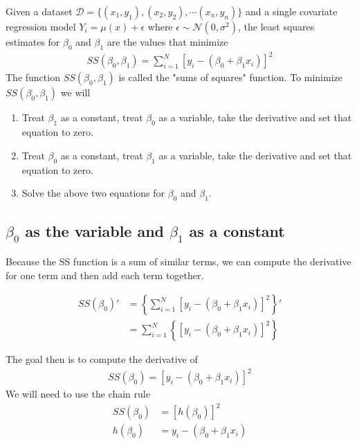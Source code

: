 Given a dataset $\mathcal{D} = \{ (x_{1},y_{1}), (x_{2},y_{2}), \cdots (x_{n},y_{n}) \}$ and a single covariate regression model $Y_{i} = \mu(x) + \epsilon$ where $\epsilon \sim \mathcal{N}(0,\sigma^{2})$, the least squares estimates for $\beta_{0}$ and $\beta_{1}$ are the values that minimize 
\begin{align}
    SS(\beta_{0}, \beta_{1}) = \sum_{i=1}^{N} \left[ y_{i} - \left(\beta_{0} + \beta_{1}x_{i} \right)  \right]^{2}
\end{align}
The function $SS(\beta_{0}, \beta_{1})$ is called the "sums of squares" function.
To minimize $SS(\beta_{0}, \beta_{1})$ we will
\begin{enumerate}
    \item Treat $\beta_{1}$ as a constant, treat $\beta_{0}$ as a variable, take the derivative and set that equation to zero. 
    \item Treat $\beta_{0}$ as a constant, treat $\beta_{1}$ as a variable, take the derivative and set that equation to zero. 
    \item Solve the above two equations for $\beta_{0}$ and $\beta_{1}$.
\end{enumerate}

\subsection{ $\beta_{0}$ as the variable and $\beta_{1}$ as a constant}

Because the SS function is a sum of similar terms, we can compute the derivative for one term and then add each term together. 

\begin{align}
    SS(\beta_{0})' &= \left\{ \sum_{i=1}^{N} \left[ y_{i} - \left(\beta_{0} + \beta_{1}x_{i} \right)  \right]^{2} \right \}' \\
    &=  \sum_{i=1}^{N} \left\{ \left[ y_{i} - \left(\beta_{0} + \beta_{1}x_{i} \right)   \right]^{2}\right \}
\end{align}

The goal then is to compute the derivative of 
\begin{align}
    SS(\beta_{0}) = \left[ y_{i} - \left(\beta_{0} + \beta_{1}x_{i} \right)  \right]^{2}
\end{align}
We will need to use the chain rule
\begin{align}
    SS(\beta_{0}) &= \left[ h(\beta_{0}) \right]^{2} \\ 
    h(\beta_{0}) &= y_{i} - \left(\beta_{0} + \beta_{1}x_{i} \right) \\
\end{align}

